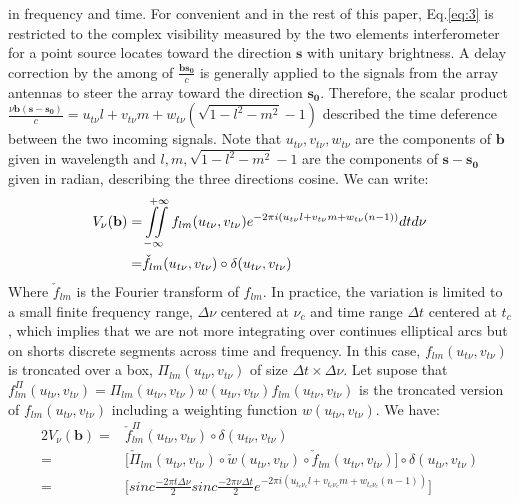 in frequency and time. 
For convenient and in the rest of this paper, Eq.\ref{eq:3} is restricted to the complex visibility
measured by the two elements interferometer for a point source locates toward the direction 
$\mathbf{s}$ with unitary brightness. A delay correction by the among of $\frac{\mathbf{b}\mathbf{s_0}}{c}$ is generally applied to the signals from the 
array antennas to steer the array toward the direction $\mathbf{s_0}$.
Therefore, the scalar product $\frac{\nu \mathbf{b}(\mathbf{s}-\mathbf{s_0})}{c}=u_{t\nu}l + v_{t\nu}m + w_{t\nu}(\sqrt{1-l^2 - m^2}-1)$
described the time deference between the two incoming signals. Note that
$u_{t\nu}, v_{t\nu}, w_{t\nu}$ are the components of  $\mathbf{b}$ 
given in wavelength and $l,m, \sqrt{1-l^2-m^2}-1$ are the components of  $\mathbf{s}-\mathbf{s_0}$ given in radian, describing the 
three directions cosine. 
We can write:
\begin{alignat}{2}
V_{\nu}(\mathbf{b})  =& \iint\limits_{-\infty}^{\hspace{.3cm}+\infty}f_{lm}(u_{t\nu},v_{t\nu})e^{-2\pi i (u_{t\nu}l+v_{t\nu}m+w_{t\nu}(n-1))}dt d\nu\\
		      =& \check{f}_{lm}(u_{t\nu},v_{t\nu})\circ \delta(u_{t\nu},v_{t\nu}) \label{eq:4}
\end{alignat} %
Where $\check{f}_{lm}$ is the Fourier transform of $f_{lm}$.
In practice, the variation is limited to a small finite frequency range, $\Delta \nu$ centered at $\nu_c$ 
and time range $\Delta t$ centered
at $t_c$, which implies that we are not more integrating over continues elliptical arcs but on shorts discrete
segments across time and frequency. In this case,  $f_{lm}(u_{t\nu},v_{t\nu})$ is troncated over a box, $\Pi_{lm}(u_{t\nu},v_{t\nu})$ 
of size $\Delta t \times \Delta \nu$.
Let supose that $f^{\Pi}_{lm}(u_{t\nu},v_{t\nu})=\Pi_{lm}(u_{t\nu},v_{t\nu})w(u_{t\nu},v_{t\nu})f^{}_{lm}(u_{t\nu},v_{t\nu})$ is 
the troncated version of  $f_{lm}(u_{t\nu},v_{t\nu})$ including a weighting function $w(u_{t\nu},v_{t\nu})$.
We have: %
\begin{alignat*}{2}
V_{\nu}(\mathbf{b}) =& \check{f}^{\Pi}_{lm}(u_{t\nu},v_{t\nu})\circ\delta(u_{t\nu},v_{t\nu})\\
		    =& \Bigg[\check{\Pi}_{lm}(u_{t\nu},v_{t\nu})\circ \check{w}(u_{t\nu},v_{t\nu})\circ \check{f}^{}_{lm}(u_{t\nu},v_{t\nu})\Bigg]\circ \delta(u_{t\nu},v_{t\nu})\\
		    =&\Bigg[sinc\frac{-2\pi t\Delta \nu}{2}sinc\frac{-2\pi\nu\Delta t}{2}e^{-2\pi i (u_{t_c\nu_c}l+v_{t_c\nu_c}m+w_{t_c\nu_c}(n-1))}\Bigg]
\end{alignat*}			
